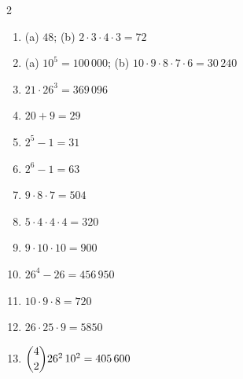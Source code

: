 \documentclass[11pt]{article}
\begin{document}
\begin{keybox}
\begin{multicols}{2}
\small
\begin{enumerate}[leftmargin=*,itemsep=3pt]
  \item (a) $48$; (b) $2\cdot3\cdot4\cdot3=72$
  \item (a) $10^5=100\,000$; (b) $10\cdot9\cdot8\cdot7\cdot6=30\,240$
  \item $21\cdot26^3=369\,096$
  \item $20+9=29$
  \item $2^5-1=31$
  \item $2^6-1=63$
  \item $9\cdot8\cdot7=504$
  \item $5\cdot4\cdot4\cdot4=320$
  \item $9\cdot10\cdot10=900$
  \item $26^4-26=456\,950$
  \item $10\cdot9\cdot8=720$
  \item $26\cdot25\cdot9=5850$
  \item $\dbinom{4}{2}26^2\,10^2=405\,600$
\end{enumerate}
\end{multicols}
\end{keybox}
\end{document}
